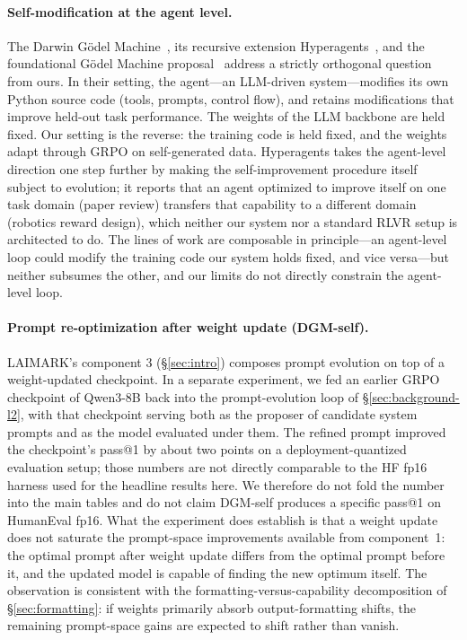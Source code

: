 \documentclass[11pt,a4paper]{article}
\begin{document}
\paragraph{Self-modification at the agent level.}
The Darwin G{\"o}del Machine~\citep{zhang2025dgm}, its recursive extension Hyperagents~\citep{zhang2026hyperagents}, and the foundational G{\"o}del Machine proposal~\citep{schmidhuber2003godel} address a strictly orthogonal question from ours.
In their setting, the agent---an LLM-driven system---modifies its own Python source code (tools, prompts, control flow), and retains modifications that improve held-out task performance.
The weights of the LLM backbone are held fixed.
Our setting is the reverse: the training code is held fixed, and the weights adapt through GRPO on self-generated data.
Hyperagents takes the agent-level direction one step further by making the self-improvement procedure itself subject to evolution; it reports that an agent optimized to improve itself on one task domain (paper review) transfers that capability to a different domain (robotics reward design), which neither our system nor a standard RLVR setup is architected to do.
The lines of work are composable in principle---an agent-level loop could modify the training code our system holds fixed, and vice versa---but neither subsumes the other, and our limits do not directly constrain the agent-level loop.

\paragraph{Prompt re-optimization after weight update (DGM-self).}
LAIMARK's component 3 (\S\ref{sec:intro}) composes prompt evolution on top of a weight-updated checkpoint.
In a separate experiment, we fed an earlier GRPO checkpoint of Qwen3-8B back into the prompt-evolution loop of \S\ref{sec:background-l2}, with that checkpoint serving both as the proposer of candidate system prompts and as the model evaluated under them.
The refined prompt improved the checkpoint's pass@1 by about two points on a deployment-quantized evaluation setup; those numbers are not directly comparable to the HF fp16 harness used for the headline results here.
We therefore do not fold the number into the main tables and do not claim DGM-self produces a specific pass@1 on HumanEval fp16.
What the experiment does establish is that a weight update does not saturate the prompt-space improvements available from component~1: the optimal prompt after weight update differs from the optimal prompt before it, and the updated model is capable of finding the new optimum itself.
The observation is consistent with the formatting-versus-capability decomposition of \S\ref{sec:formatting}: if weights primarily absorb output-formatting shifts, the remaining prompt-space gains are expected to shift rather than vanish.
\end{document}
